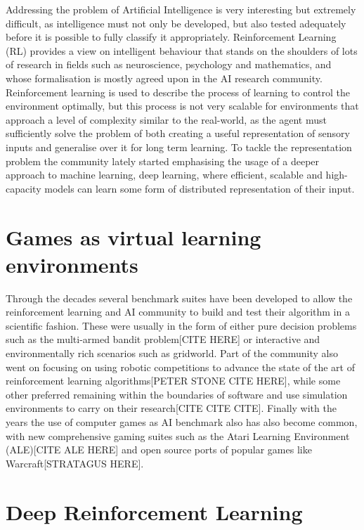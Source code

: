 \documentclass[bsc,frontabs,twoside,singlespacing,parskip,deptreport]{infthesis}     %
\begin{document}
Addressing the problem of Artificial Intelligence is very interesting but
extremely difficult, as intelligence must not only be developed, but also tested
adequately before it is possible to fully classify it appropriately.
Reinforcement Learning (RL) provides a view on intelligent behaviour that stands
on the shoulders of lots of research in fields such as neuroscience, psychology
and mathematics, and whose formalisation is mostly agreed upon in the AI
research community\cite{Sutton:1998:IRL:551283}. Reinforcement learning is used
to describe the process of learning to control the environment optimally, but
this process is not very scalable for environments that approach a level of
complexity similar to the real-world, as the agent must sufficiently solve the
problem of both creating a useful representation of sensory inputs and
generalise over it for long term learning. To tackle the representation problem
the community lately started emphasising the usage of a deeper approach to
machine learning, deep learning, where efficient, scalable and high-capacity
models can learn some form of distributed representation of their
input\cite{lecun2015deep}.

\section{Games as virtual learning environments}

Through the decades several benchmark suites have been developed to allow the
reinforcement learning and AI community to build and test their algorithm in a
scientific fashion. These were usually in the form of either pure decision
problems such as the multi-armed bandit problem[CITE HERE] or interactive and
environmentally rich scenarios such as gridworld. Part of the community also
went on focusing on using robotic competitions to advance the state of the art
of reinforcement learning algorithms[PETER STONE CITE HERE], while some other
preferred remaining within the boundaries of software and use simulation
environments to carry on their research[CITE CITE CITE]. Finally with the years
the use of computer games as AI benchmark also has also become common, with new
comprehensive gaming suites such as the Atari Learning Environment (ALE)[CITE
ALE HERE] and open source ports of popular games like Warcraft[STRATAGUS HERE].

\section{Deep Reinforcement Learning}
\end{document}
